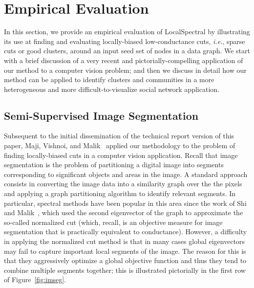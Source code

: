 \documentclass[11pt]{article}
\begin{document}
\section{Empirical Evaluation}
\label{sxn:empirical} 

In this section, we provide an empirical evaluation of \textsf{LocalSpectral} 
by illustrating its use at finding and evaluating locally-biased 
low-conductance cuts, \emph{i.e.}, sparse cuts or good clusters, around an input seed set of nodes in 
a data graph.
We start with a brief discussion of a very recent and pictorially-compelling 
application of our method to a computer vision problem; and then we discuss 
in detail how our method can be applied to identify clusters and communities 
in a more heterogeneous and more difficult-to-visualize social network 
application.

\subsection{Semi-Supervised Image Segmentation}

Subsequent to the initial dissemination of the technical report version of 
this paper, Maji, Vishnoi, and Malik~\cite{MVM11} applied our methodology to 
the problem of finding locally-biased cuts in a computer vision application.
Recall that image segmentation is the problem of partitioning a digital image 
into segments corresponding to significant objects and areas in the image. 
A standard approach consists in converting the image data into a similarity 
graph over the the pixels and applying a graph partitioning algorithm to 
identify relevant segments. 
In particular, spectral methods have been popular in this area since the 
work of Shi and Malik~\cite{ShiMalik00_NCut}, which used the second 
eigenvector of the graph to approximate the so-called normalized cut 
(which, recall, is an objective measure for image segmentation that is 
practically equivalent to conductance). 
However, a difficulty in applying the normalized cut method is that in many 
cases global eigenvectors may fail to capture important local segments of 
the image.
The reason for this is that they aggressively optimize a global objective 
function and thus they tend to combine multiple segments together; 
this is illustrated pictorially in the first row of Figure~\ref{fig:imseg}.
\end{document}
